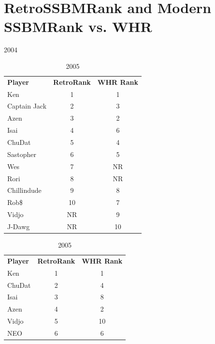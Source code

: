 \documentclass[10pt]{article}
\theoremstyle{definition}
\theoremstyle{remark}
\begin{document}
\newpage
\section{RetroSSBMRank and Modern SSBMRank vs. WHR}
\begin{table}[!ht]
    \footnotesize

    \parbox{.33 \textwidth}{
        \centering
        \caption{2004}
\begin{tabular}{lcc}
    \textbf{Player} & \textbf{RetroRank} & \textbf{WHR Rank} \\
    Ken             & 1                      & 1        \\
    Captain Jack    & 2                      & 3        \\
    Azen            & 3                      & 2        \\
    Isai            & 4                      & 6        \\
    ChuDat          & 5                      & 4        \\
    Sastopher       & 6                      & 5        \\
    Wes             & 7                      & NR       \\
    Rori            & 8                      & NR       \\
    Chillindude     & 9                      & 8        \\
    Rob\$           & 10                     & 7        \\
    Vidjo           & NR                     & 9        \\
    J-Dawg          & NR                     & 10        \\
\end{tabular}
}
    \parbox{.33 \textwidth}{
        \centering
        \caption{2005}
\begin{tabular}{lcc}
    \textbf{Player} & \textbf{RetroRank} & \textbf{WHR Rank} \\
    Ken             & 1                      & 1        \\
    ChuDat          & 2                      & 4        \\
    Isai            & 3                      & 8        \\
    Azen            & 4                      & 2        \\
    Vidjo           & 5                      & 10       \\
    NEO             & 6                      & 6        \\

\end{tabular}}
\end{table}
\end{document}
